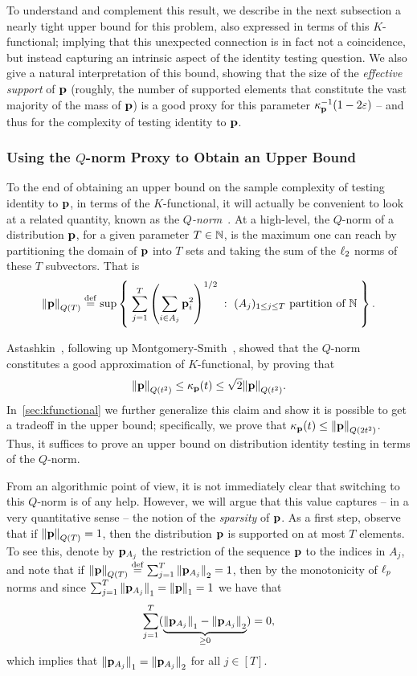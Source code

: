To understand and complement this result, we describe in the next subsection a nearly tight upper bound for this problem, also expressed in terms of this $K$-functional; implying that this unexpected connection is in fact not a coincidence, but instead capturing an intrinsic aspect of the identity testing question. We also give a natural interpretation of this bound, showing that the size of the \emph{effective support} of $\p$ (roughly, the number of supported elements that constitute the vast majority of the mass of $\p$) is a good proxy for this parameter $\kf{\p}^{-1}(1-2\eps)$ -- and thus for the complexity of testing identity to $\p$.

\subsubsection{Using the $Q$-norm Proxy to Obtain an Upper Bound}
\label{sec:overview:ub}
To the end of obtaining an upper bound on the sample complexity of testing identity to $\p$, in terms of the $K$-functional, it will actually be convenient to look at a related quantity, known as the \emph{$Q$-norm}~\cite{MS:90}. At a high-level, the $Q$-norm of a distribution $\p$, for a given parameter $T\in\N$, is the maximum one can reach by partitioning the domain of $\p$ into $T$ sets and taking the sum of the $\lp[2]$ norms of these $T$ subvectors. That is
 \[
    \norm{\p}_{Q(T)} \eqdef \sup \setOfSuchThat{ \sum_{j=1}^T \left( \sum_{i\in A_j} \p_i^2 \right)^{1/2} }{ (A_j)_{1\leq j\leq T} \text{ partition of } \N }.
  \]

Astashkin~\cite{Astashkin:2010}, following up Montgomery-Smith~\cite{MS:90}, showed that the $Q$-norm constitutes a good approximation of $K$-functional, by proving that
  \begin{equation*}
    \norm{\p}_{Q(t^2)} \leq \kf{\p}(t) \leq \sqrt{2}\norm{\p}_{Q(t^2)}.
  \end{equation*}
In~\cref{sec:kfunctional} we further generalize this claim and show it is possible to get a tradeoff in the upper bound; specifically, we prove that
$\kf{\p}(t) \leq \norm{\p}_{Q(2t^2)}$. Thus, it suffices to prove an upper bound on distribution identity testing in terms of the $Q$-norm.

From an algorithmic point of view, it is not immediately clear that switching to this $Q$-norm is of any help. However, we will argue that this value captures -- in a very quantitative sense -- the notion of the \emph{sparsity} of $\p$. As a first step, observe that if $\norm{\p}_{Q(T)} = 1$, then the distribution $\p$ is supported on at most $T$ elements. To see this, denote by $\p_{A_j}$ the restriction of the sequence $\p$ to the indices in $A_j$, and note that if $\norm{\p}_{Q(T)} \eqdef \sum_{j=1}^T \normtwo{ \p_{A_j} }=1$, then  by the monotonicity of $\lp[p]$ norms and since $\sum_{j=1}^T \normone{ \p_{A_j} } = \normone{\p}=1$ we have that
\[
      \sum_{j=1}^T (\underbrace{ \normone{ \p_{A_j} } - \normtwo{ \p_{A_j} } }_{\geq 0}) = 0,
\]
which implies that $\normone{ \p_{A_j} } = \normtwo{ \p_{A_j} }$ for all $j\in[T]$.

